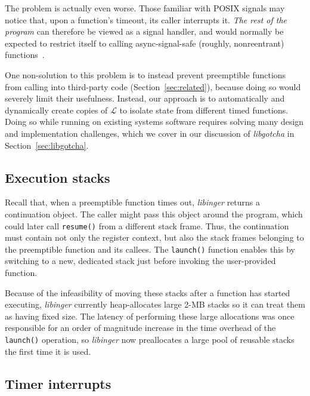 The problem is actually even worse.  Those familiar with POSIX signals may notice
that, upon a function's timeout, its caller interrupts it.  \textit{The rest of the
program} can therefore be viewed as a signal handler, and would normally be expected
to restrict itself to calling async-signal-safe (roughly, nonreentrant)
functions~\cite{signal-safety-manpage}.

One non-solution to this problem is to instead prevent preemptible functions from
calling into third-party code (Section~\ref{sec:related}), because doing so would
severely limit their usefulness.  Instead, our approach
is to automatically and dynamically create copies of $\mathcal{L}$ to
isolate state from different timed functions. Doing so while running on
existing systems software requires solving many
design and implementation challenges, which we cover in our discussion of
\textit{libgotcha} in Section~\ref{sec:libgotcha}.


\subsection{Execution stacks}

Recall that, when a preemptible function times out, \textit{libinger} returns a
continuation object.  The caller might pass this object around the program, which
could later call \texttt{resume()} from a different stack frame.  Thus, the
continuation must contain not only the register context, but also the stack
frames belonging to the preemptible function and its callees.  The \texttt{launch()}
function enables this by switching to a new, dedicated stack just before invoking the
user-provided function.

Because of the infeasibility of moving these stacks after a function has started
executing, \textit{libinger} currently heap-allocates large 2-MB stacks so it can
treat them as having fixed size.  The latency of performing these large allocations
was once responsible for an order of magnitude increase in the time overhead of the
\texttt{launch()} operation, so \textit{libinger} now preallocates a large pool of
reusable stacks the first time it is used.


\subsection{Timer interrupts}

